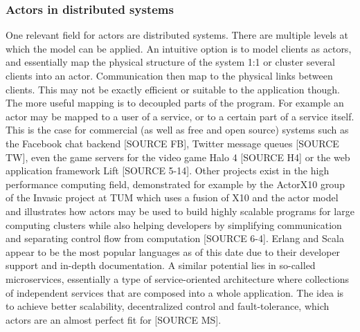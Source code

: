 \documentclass[A4]{article}
\begin{document}
\subsubsection{Actors in distributed systems}
One relevant field for actors are distributed systems. There are multiple levels at which the model can be applied. An intuitive option is to model clients as actors, and essentially map the physical structure of the system 1:1 or cluster several clients into an actor. Communication then map to the physical links between clients. This may not be exactly efficient or suitable to the application though. The more useful mapping is to decoupled parts of the program. For example an actor may be mapped to a user of a service, or to a certain part of a service itself. This is the case for commercial (as well as free and open source) systems such as the Facebook chat backend [SOURCE FB], Twitter message queues [SOURCE TW], even the game servers for the video game Halo 4 [SOURCE H4] or the web application framework Lift [SOURCE 5-14]. Other projects exist in the high performance computing field, demonstrated for example by the ActorX10 group of the Invasic project at TUM which uses a fusion of X10 and the actor model and illustrates how actors may be used to build highly scalable programs for large computing clusters while also helping developers by simplifying communication and separating control flow from computation [SOURCE 6-4]. Erlang and Scala appear to be the most popular languages as of this date due to their developer support and in-depth documentation.
A similar potential lies in so-called microservices, essentially a type of service-oriented architecture where collections of independent services that are composed into a whole application. The idea is to achieve better scalability, decentralized control and fault-tolerance, which actors are an almost perfect fit for [SOURCE MS].
\end{document}
